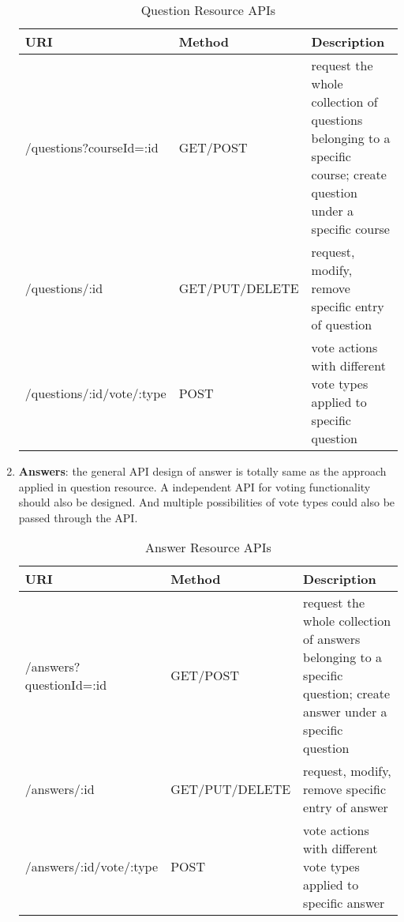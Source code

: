 \begin{enumerate}
\begin{table}[!htbp]
\begin{tabularx}{\textwidth}{@{}llX@{}}
\toprule
URI                                   & Method         & Description                                                                                                                                                 \\ \midrule
/questions?courseId=:id               & GET/POST       & request the whole collection of questions belonging to a specific course; create question under a specific course \\
/questions/:id                & GET/PUT/DELETE & request, modify, remove specific entry of question                                                                                                          \\
/questions/:id/vote/:type      & POST          & vote actions with different vote types applied to specific question  \\ \bottomrule
\end{tabularx}
\caption{Question Resource APIs}
\label{question-resource-apis}
\end{table}


\item
\textbf{Answers}: the general API design of answer is totally same as the approach applied in question resource. A independent API for voting functionality should also be designed. And multiple possibilities of vote types could also be passed through the API.

\begin{table}[!htbp]
\centering

\begin{tabularx}{\textwidth}{@{}llX@{}}
\toprule
URI                                 & Method         & Description                                                                                                                                                 \\ \midrule
/answers?questionId=:id             & GET/POST       & request the whole collection of answers belonging to a specific question; create answer under a specific question\\
/answers/:id                        & GET/PUT/DELETE & request, modify, remove specific entry of answer                                                                                                            \\
/answers/:id/vote/:type             & POST           & vote actions with different vote types applied to specific answer                                                                                           \\ \bottomrule
\end{tabularx}
\caption{Answer Resource APIs}
\label{answer-resources-apis}
\end{table}

\end{enumerate}

